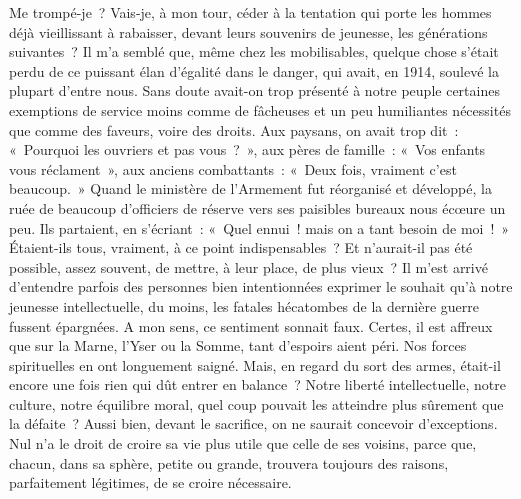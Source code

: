 \documentclass[french,twoside]{book} %
\begin{document}
Me trompé-je ? Vais-je, à mon tour, céder à la tentation qui porte les hommes déjà vieillissant à rabaisser, devant leurs souvenirs de jeunesse, les générations suivantes ? Il m’a semblé que, même chez les mobilisables, quelque chose s’était perdu de ce puissant élan d’égalité dans le danger, qui avait, en 1914, soulevé la plupart d’entre nous. Sans doute avait-on trop présenté à notre peuple certaines exemptions de service moins comme de fâcheuses et un peu humiliantes nécessités que comme des faveurs, voire des droits. Aux paysans, on avait trop   dit : « Pourquoi les ouvriers et pas vous ? », aux pères de famille : « Vos enfants vous réclament », aux anciens combattants : « Deux fois, vraiment c’est beaucoup. » Quand le ministère de l’Armement fut réorganisé et développé, la ruée de beaucoup d’officiers de réserve vers ses paisibles bureaux nous écœure un peu. Ils partaient, en s’écriant : « Quel ennui ! mais on a tant besoin de moi ! » Étaient-ils tous, vraiment, à ce point indispensables ? Et n’aurait-il pas été possible, assez souvent, de mettre, à leur place, de plus vieux ? Il m’est arrivé d’entendre parfois des personnes bien intentionnées exprimer le souhait qu’à notre jeunesse intellectuelle, du moins, les fatales hécatombes de la dernière guerre fussent épargnées. A mon sens, ce sentiment sonnait faux. Certes, il est affreux que sur la Marne, l’Yser ou la Somme, tant d’espoirs aient péri. Nos forces spirituelles en ont longuement saigné. Mais, en regard du sort des armes, était-il encore une fois rien qui dût entrer en balance ? Notre liberté intellectuelle, notre culture, notre équilibre moral, quel coup pouvait les atteindre plus sûrement que la défaite ? Aussi bien, devant le sacrifice, on ne saurait concevoir d’exceptions. Nul n’a le droit de croire sa vie plus utile que celle de ses voisins, parce que, chacun, dans sa sphère, petite ou grande, trouvera toujours des raisons, parfaitement légitimes, de se croire nécessaire.\par
\end{document}
